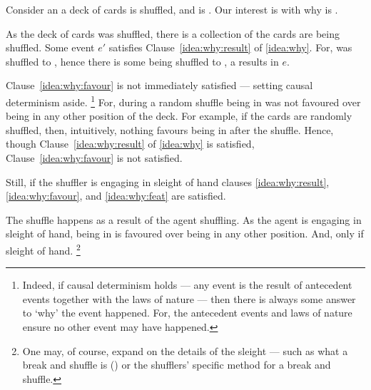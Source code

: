 \begin{note}
  Consider an  a deck of cards is shuffled, and \mainCard{} is \mainCardPos{}.
  Our interest is with why \mainCard{} is \mainCardPos{}.

  As the deck of cards was shuffled, there is a collection of  the cards are being shuffled.
  Some event \(e'\) satisfies Clause~\ref{idea:why:result} of \autoref{idea:why}.
  For, \mainCard{} was shuffled to \mainCardPosX{}, hence there is some  \mainCard{} being shuffled to \mainCardPos{}, a results in \(e\).

  Clause~\ref{idea:why:favour} is not immediately satisfied --- setting causal determinism aside.%
  \footnote{
    \nocite{Hoefer:2023aa}%
    Indeed, if causal determinism holds --- any event is the result of antecedent events together with the laws of nature --- then there is always some answer to `why' the event happened.
    For, the antecedent events and laws of nature ensure no other event may have happened.
  }
  For, during a random shuffle \mainCard{} being in \mainCardPos{} was not favoured over \mainCard{} being in any other position of the deck.
  For example, if the cards are randomly shuffled, then, intuitively, nothing favours \mainCard{} being in \mainCardPos{} after the shuffle.
  Hence, though Clause~\ref{idea:why:result} of \autoref{idea:why} is satisfied, Clause~\ref{idea:why:favour} is not satisfied.

  Still, if the shuffler is engaging in sleight of hand clauses \ref{idea:why:result}, \ref{idea:why:favour}, and \ref{idea:why:feat} are satisfied.

  The shuffle happens as a result of the agent shuffling.
  As the agent is engaging in sleight of hand, \mainCard{} being in \mainCardPos{} is favoured over \mainCard{} being in any other position.
  And, only if sleight of hand.%
  \footnote{
    One may, of course, expand on the details of the sleight --- such as what a break and shuffle is (\cite[cf.][189--190]{Hilliard:1994aa}) or the shufflers' specific method for a break and shuffle.
  }
\end{note}


